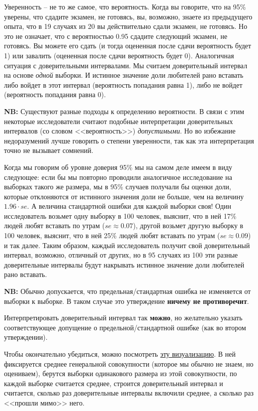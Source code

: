 \documentclass[a4paper,12pt]{extarticle}
\begin{document}
Уверенность -- не то же самое, что вероятность. Когда вы говорите, 
что на 95\% уверены, что сдадите экзамен, не готовясь, вы, возможно, 
знаете из предыдущего опыта, что в 19 случаях из 20 вы действительно 
сдали экзамен, не готовясь. Но это не означает, что  с вероятностью 0.95 
сдадите следующий экзамен, не готовясь. Вы можете его сдать (и тогда 
оцененная после сдачи вероятность будет 1) или завалить (оцененная 
после сдачи вероятность будет 0). Аналогичная ситуация с доверительными 
интервалами. Мы считаем доверительный интервал на основе \textit{одной} 
выборки. И истинное значение доли любителей рано вставать либо войдет 
в этот интервал (вероятность попадания равна 1), либо не войдет (вероятность 
попадания равна 0). 

\textbf{NB:} Существуют разные подходы к определению вероятности. В 
связи с этим некоторые исследователи считают подобные интерпретации 
доверительных интервалов (со словом <<вероятность>>) \textit{допустимыми}. 
Но во избежание недоразумений лучше говорить о степени уверенности, 
так как эта интерпретация точно не вызывает сомнений.\medskip\\

Когда мы говорим об уровне доверия 95\% мы на самом деле 
имеем в виду следующее: если бы мы повторно проводили аналогичное 
исследование на выборках такого же размера, мы в 95\% случаев получали 
бы оценки доли, которые отклоняются от истинного значения доли не больше, 
чем на величину $1.96\cdot se$. А величина стандартной ошибки для 
каждой выборки своя! Один исследователь возьмет одну выборку в 100 
человек, выяснит, что в ней 17\% людей любят вставать по утрам 
($se \approx 0.07$), другой возьмет другую выборку в 100 человек, 
выяснит, что в ней 25\% людей любят вставать по утрам 
($se \approx 0.09 $) и так далее. Таким образом, каждый исследователь 
получит свой доверительный интервал, возможно, отличный от других, 
но в 95 случаях из 100 эти разные доверительные интервалы будут 
накрывать истинное значение доли любителей рано вставать.

\textbf{NB:} Обычно допускается, что предельная/стандартная ошибка 
не изменяется от выборки к выборке. В таком случае это утверждение 
\textbf{ничему не противоречит}.


Интерпретировать доверительный интервал так \textbf{можно}, но 
желательно указать соответствующее допущение о 
предельной/стандартной ошибке (как во втором утверждении).

Чтобы окончательно убедиться, можно посмотреть 
\href{http://rpsychologist.com/d3/CI/}{эту визуализацию}. 
В ней фиксируется среднее генеральной совокупности (которое мы 
обычно не знаем, но оцениваем), берутся выборки одинакового размера 
из этой совокупности, по каждой выборке считается среднее, строится 
доверительный интервал и считается, сколько раз доверительные 
интервалы включили среднее, а сколько раз <<прошли мимо>> него. 
\end{document}
